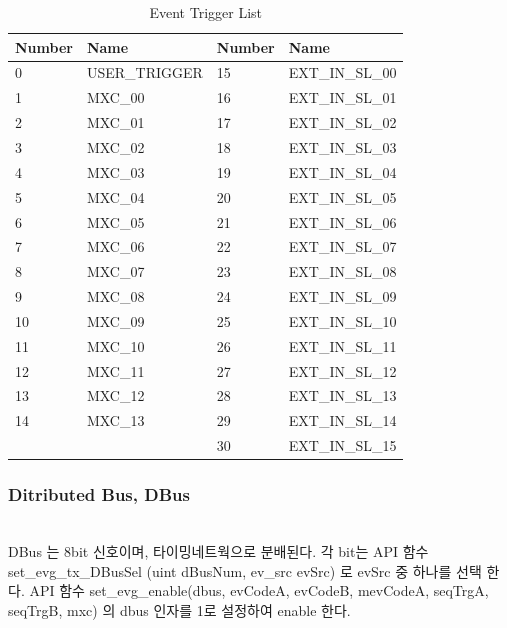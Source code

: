 \documentclass[journal]{IEEEtran}
\begin{document}
\begin{table}[h!t]
	\centering
	\caption{Event Trigger List}
	\label{event_tri_list}
	
	\begin{tabular}{@{}llll@{}}
		\hline
		\textbf{Number}	& \textbf{Name}			& \textbf{Number}		& \textbf{Name}\\
		\hline
		0				& USER\_TRIGGER			& 15					& EXT\_IN\_SL\_00\\
		1				& MXC\_00				& 16					& EXT\_IN\_SL\_01\\
		2				& MXC\_01				& 17					& EXT\_IN\_SL\_02\\
		3				& MXC\_02				& 18					& EXT\_IN\_SL\_03\\
		4				& MXC\_03				& 19					& EXT\_IN\_SL\_04\\
		5				& MXC\_04				& 20					& EXT\_IN\_SL\_05\\
		6				& MXC\_05				& 21					& EXT\_IN\_SL\_06\\
		7				& MXC\_06				& 22					& EXT\_IN\_SL\_07\\
		8				& MXC\_07				& 23					& EXT\_IN\_SL\_08\\
		9				& MXC\_08				& 24					& EXT\_IN\_SL\_09\\
		10				& MXC\_09				& 25					& EXT\_IN\_SL\_10\\
		11				& MXC\_10				& 26					& EXT\_IN\_SL\_11\\
		12				& MXC\_11				& 27					& EXT\_IN\_SL\_12\\
		13				& MXC\_12				& 28					& EXT\_IN\_SL\_13\\
		14				& MXC\_13				& 29					& EXT\_IN\_SL\_14\\
						& 						& 30					& EXT\_IN\_SL\_15\\
		\hline
	\end{tabular}
\end{table}

\subsubsection{Ditributed Bus, DBus}\hspace*{\fill} \\
DBus 는 8bit 신호이며, 타이밍네트웍으로 분배된다. 각 bit는 API 함수 set\_evg\_tx\_DBusSel (uint dBusNum, ev\_src evSrc) 로 evSrc 중 하나를 선택 한다.
API 함수 set\_evg\_enable(dbus, evCodeA, evCodeB, mevCodeA, seqTrgA, seqTrgB, mxc) 의 dbus 인자를 1로 설정하여 enable 한다.
\end{document}
